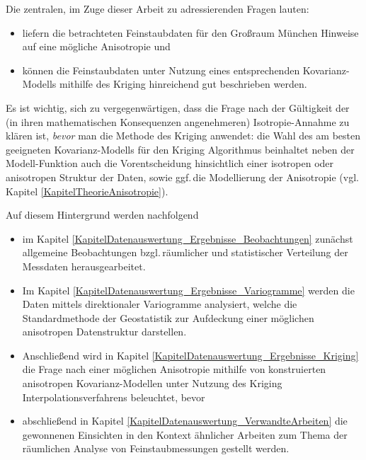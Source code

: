 Die zentralen, im Zuge dieser Arbeit zu adressierenden Fragen
lauten:
\begin{itemize}[topsep=2pt,parsep=1pt,itemsep=0.5pt]
\item[a) ] liefern die betrachteten Feinstaubdaten für den Großraum München 
Hinweise auf eine mögliche Anisotropie und
\item[b) ] können die Feinstaubdaten unter Nutzung eines entsprechenden
Kovarianz-Modells mithilfe des Kriging hinreichend gut 
beschrieben werden.
\end{itemize}

\vspace*{6pt}
Es ist wichtig, sich zu vergegenwärtigen, dass die Frage nach der
Gültigkeit der (in ihren mathematischen Konsequenzen angenehmeren) 
Isotropie-Annahme zu klären ist, \textit{bevor} man die Methode 
des Kriging anwendet: die Wahl des am besten geeigneten
Kovarianz-Modells für den Kriging Algorithmus beinhaltet 
neben der Modell-Funktion auch die Vorentscheidung hinsichtlich 
einer isotropen oder anisotropen Struktur der Daten, sowie 
ggf.\,die Modellierung der Anisotropie 
(vgl.\,Kapitel \ref{KapitelTheorieAnisotropie}). 

Auf diesem Hintergrund werden nachfolgend 
\begin{itemize}[topsep=2pt,parsep=1pt,itemsep=0.5pt]
\item[$\circ$ ] im Kapitel 
\ref{KapitelDatenauswertung_Ergebnisse_Beobachtungen}
zunächst allgemeine Beobachtungen bzgl.\,räumlicher und 
statistischer Verteilung der Messdaten herausgearbeitet.
\item[$\circ$ ] Im Kapitel
\ref{KapitelDatenauswertung_Ergebnisse_Variogramme}
werden die Daten mittels 
direktionaler Variogramme analysiert,
welche die Standardmethode der Geostatistik zur 
Aufdeckung einer möglichen anisotropen Datenstruktur
darstellen.
\item[$\circ$ ] Anschließend wird in 
Kapitel \ref{KapitelDatenauswertung_Ergebnisse_Kriging} 
die Frage nach einer möglichen 
Anisotropie mithilfe von 
konstruierten anisotropen Kovarianz-Modellen unter Nutzung 
des Kriging Interpolationsverfahrens beleuchtet, bevor 
\item[$\circ$] abschließend in Kapitel 
\ref{KapitelDatenauswertung_VerwandteArbeiten} die 
gewonnenen Einsichten in den 
Kontext ähnlicher Arbeiten zum Thema der räumlichen 
Analyse von Feinstaubmessungen gestellt werden.
\end{itemize} 

